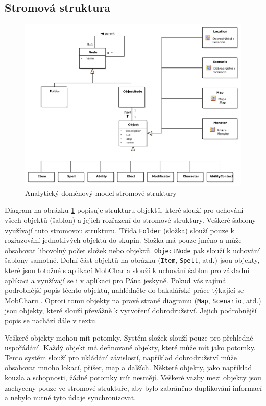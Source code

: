 \documentclass[thesis=B,czech]{resources/FITthesis}[2012/06/26]
\begin{document}
\subsection{Stromová struktura}
\begin{figure}\centering
	\includegraphics[width=1\textwidth]{images/domain_struktura}
	\caption[Analytický doménový model stromové struktury]{Analytický doménový model stromové struktury}\label{fig:dm_stromova_struktura}
\end{figure}
Diagram na obrázku \ref{fig:dm_stromova_struktura} popisuje strukturu objektů, které slouží pro uchování všech objektů (šablon) a jejich rozřazení do stromové struktury. Veškeré šablony využívají tuto stromovou strukturu. Třída \texttt{Folder} (složka) slouží pouze k rozřazování jednotlivých objektů do skupin. Složka má pouze jméno a může obsahovat libovolný počet složek nebo objektů. \texttt{ObjectNode} pak slouží k uchování šablony samotné. Dolní část objektů na obrázku (\texttt{Item}, \texttt{Spell}, atd.) jsou objekty, které jsou totožné s aplikací MobChar a slouží k uchování šablon pro základní aplikaci a využívají se i v aplikaci pro Pána jeskyně. Pokud vás zajímá podrobnější popis těchto objektů, nahlédněte do bakalářské práce týkající se MobCharu \cite{Weberova_2017}. Oproti tomu objekty na pravé straně diagramu (\texttt{Map}, \texttt{Scenario}, atd.) jsou objekty, které slouží převážně k vytvoření dobrodružství. Jejich podrobnější popis se nachází dále v textu.\par

Veškeré objekty mohou mít potomky. Systém složek slouží pouze pro přehledné uspořádání. Každý objekt má definované objekty, které může mít jako potomky. Tento systém slouží pro ukládání závislostí, například dobrodružství může obsahovat mnoho lokací, příšer, map a dalších. Některé objekty, jako například kouzla a schopnosti, žádné potomky mít nesmějí. Veškeré vazby mezi objekty jsou zachyceny pouze ve stromové struktuře, aby bylo zabráněno duplikování informací a nebylo nutné tyto údaje synchronizovat.
\end{document}
